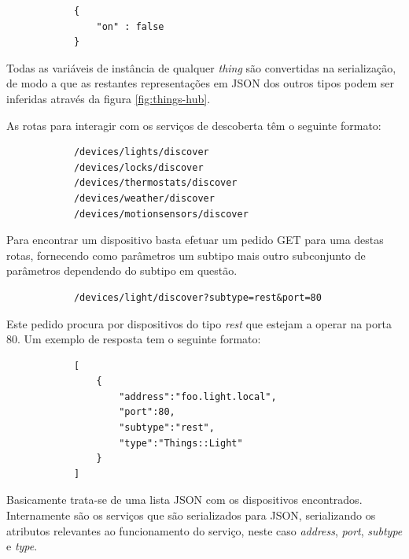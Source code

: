 \begin{verbatim}
            {
                "on" : false
            }
\end{verbatim}

Todas as variáveis de instância de qualquer \textit{thing} são convertidas na serialização, de modo a que as restantes representações em JSON dos outros tipos podem ser inferidas através da figura \ref{fig:things-hub}.

As rotas para interagir com os serviços de descoberta têm o seguinte formato:

\begin{verbatim}
            /devices/lights/discover
            /devices/locks/discover
            /devices/thermostats/discover
            /devices/weather/discover
            /devices/motionsensors/discover
\end{verbatim}

Para encontrar um dispositivo basta efetuar um pedido GET para uma destas rotas, fornecendo como parâmetros um subtipo mais outro subconjunto de parâmetros dependendo do subtipo em questão. 

\begin{verbatim}
            /devices/light/discover?subtype=rest&port=80
\end{verbatim}

Este pedido procura por dispositivos do tipo \textit{rest} que estejam a operar na porta 80. Um exemplo de resposta tem o seguinte formato:

\begin{verbatim}
            [
                {
                    "address":"foo.light.local",
                    "port":80,
                    "subtype":"rest",
                    "type":"Things::Light"
                }
            ]   
\end{verbatim}

Basicamente trata-se de uma lista JSON com os dispositivos encontrados. Internamente são os serviços que são serializados para JSON, serializando os atributos relevantes ao funcionamento do serviço, neste caso \textit{address}, \textit{port}, \textit{subtype} e \textit{type}.
